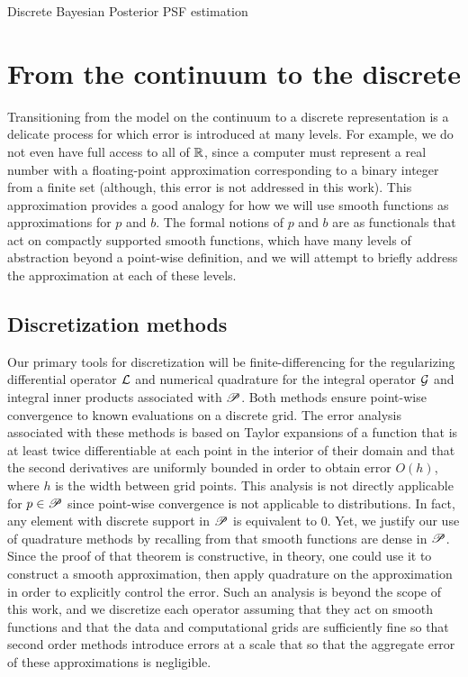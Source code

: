 \begin{chapter}{Discrete Bayesian Posterior PSF estimation}
\section{From the continuum to the discrete} \label{sec:discretization}

Transitioning from the model on the continuum to a discrete representation is a delicate process for which error is introduced at many levels.  
For example, we do not even have full access to all of $\mathbb R$, since a computer must represent a real number with a floating-point approximation corresponding to a binary integer from a finite set (although, this error is not addressed in this work). 
This approximation provides a good analogy for how we will use smooth functions as approximations for $p$ and $b$.
The formal notions of $p$ and $b$ are as functionals that act on compactly supported smooth functions, which have many levels of abstraction beyond a point-wise definition, and we will attempt to briefly address the approximation at each of these levels.

\subsection{Discretization methods}
Our primary tools for discretization will be finite-differencing for the regularizing differential operator $\mathcal L$ and numerical quadrature for the integral operator $\mathcal G$ and integral inner products associated with $\mathscr P$.
Both methods ensure point-wise convergence to known evaluations on a discrete grid.
The error analysis associated with these methods is based on Taylor expansions of a function that is at least twice differentiable at each point in the interior of their domain and that the second derivatives are uniformly bounded in order to obtain error $O(h)$, where $h$ is the width between grid points.
This analysis is not directly applicable for $p \in \mathscr P$ since point-wise convergence is not applicable to distributions.
In fact, any element with discrete support in $\mathscr P$ is equivalent to $0$.
Yet, we justify our use of quadrature methods by recalling from  that smooth functions are dense in $\mathscr P$.
  Since the proof of that theorem is constructive, in theory, one could use it to construct a smooth approximation, then apply quadrature on the approximation in order to explicitly control the error.
Such an analysis is beyond the scope of this work, and we discretize each operator assuming that they act on smooth functions and that the data and computational grids are sufficiently fine so that second order methods introduce errors at a scale that so that the aggregate error of these approximations is negligible.


\end{chapter}
